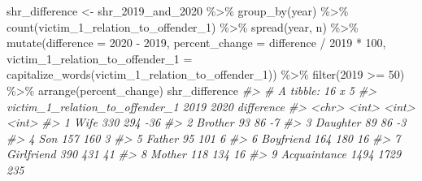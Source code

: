 \documentclass[
]{krantz}
\makeatletter
\newenvironment{Shaded}{\begin{snugshade}}{\end{snugshade}}
\newcommand{\AttributeTok}[1]{\textcolor[rgb]{0.61,0.61,0.61}{#1}}
\newcommand{\CommentTok}[1]{\textcolor[rgb]{0.37,0.37,0.37}{\textit{#1}}}
\newcommand{\DecValTok}[1]{\textcolor[rgb]{0.06,0.06,0.06}{#1}}
\newcommand{\FunctionTok}[1]{\textcolor[rgb]{0,0,0}{#1}}
\newcommand{\NormalTok}[1]{#1}
\newcommand{\OtherTok}[1]{\textcolor[rgb]{0.37,0.37,0.37}{#1}}
\newcommand{\SpecialCharTok}[1]{\textcolor[rgb]{0,0,0}{#1}}
\newcommand{\StringTok}[1]{\textcolor[rgb]{0.5,0.5,0.5}{#1}}
\newenvironment{kframe}{%
\medskip{}
\setlength{\fboxsep}{.8em}
 \def\at@end@of@kframe{}%
 \ifinner\ifhmode%
  \def\at@end@of@kframe{\end{minipage}}%
  \begin{minipage}{\columnwidth}%
 \fi\fi%
 \def\FrameCommand##1{\hskip\@totalleftmargin \hskip-\fboxsep
 \colorbox{shadecolor}{##1}\hskip-\fboxsep
     \hskip-\linewidth \hskip-\@totalleftmargin \hskip\columnwidth}%
 \MakeFramed {\advance\hsize-\width
   \@totalleftmargin\z@ \linewidth\hsize
   \@setminipage}}%
 {\par\unskip\endMakeFramed%
 \at@end@of@kframe}
\renewenvironment{Shaded}{\begin{kframe}}{\end{kframe}}
\makeatother
\begin{document}
\begin{Shaded}
\begin{Highlighting}[]
\NormalTok{shr\_difference }\OtherTok{\textless{}{-}} 
\NormalTok{  shr\_2019\_and\_2020 }\SpecialCharTok{\%\textgreater{}\%}
  \FunctionTok{group\_by}\NormalTok{(year) }\SpecialCharTok{\%\textgreater{}\%}
  \FunctionTok{count}\NormalTok{(victim\_1\_relation\_to\_offender\_1) }\SpecialCharTok{\%\textgreater{}\%}
  \FunctionTok{spread}\NormalTok{(year, n) }\SpecialCharTok{\%\textgreater{}\%}
  \FunctionTok{mutate}\NormalTok{(}\AttributeTok{difference =} \StringTok{\textasciigrave{}}\AttributeTok{2020}\StringTok{\textasciigrave{}} \SpecialCharTok{{-}} \StringTok{\textasciigrave{}}\AttributeTok{2019}\StringTok{\textasciigrave{}}\NormalTok{,}
         \AttributeTok{percent\_change =}\NormalTok{ difference }\SpecialCharTok{/} \StringTok{\textasciigrave{}}\AttributeTok{2019}\StringTok{\textasciigrave{}} \SpecialCharTok{*} \DecValTok{100}\NormalTok{,}
         \AttributeTok{victim\_1\_relation\_to\_offender\_1 =} \FunctionTok{capitalize\_words}\NormalTok{(victim\_1\_relation\_to\_offender\_1)) }\SpecialCharTok{\%\textgreater{}\%}
  \FunctionTok{filter}\NormalTok{(}\StringTok{\textasciigrave{}}\AttributeTok{2019}\StringTok{\textasciigrave{}} \SpecialCharTok{\textgreater{}=} \DecValTok{50}\NormalTok{) }\SpecialCharTok{\%\textgreater{}\%}
  \FunctionTok{arrange}\NormalTok{(percent\_change)}
\NormalTok{shr\_difference}
\CommentTok{\#\textgreater{} \# A tibble: 16 x 5}
\CommentTok{\#\textgreater{}    victim\_1\_relation\_to\_offender\_1 \textasciigrave{}2019\textasciigrave{} \textasciigrave{}2020\textasciigrave{} difference}
\CommentTok{\#\textgreater{}    \textless{}chr\textgreater{}                            \textless{}int\textgreater{}  \textless{}int\textgreater{}      \textless{}int\textgreater{}}
\CommentTok{\#\textgreater{}  1 Wife                               330    294        {-}36}
\CommentTok{\#\textgreater{}  2 Brother                             93     86         {-}7}
\CommentTok{\#\textgreater{}  3 Daughter                            89     86         {-}3}
\CommentTok{\#\textgreater{}  4 Son                                157    160          3}
\CommentTok{\#\textgreater{}  5 Father                              95    101          6}
\CommentTok{\#\textgreater{}  6 Boyfriend                          164    180         16}
\CommentTok{\#\textgreater{}  7 Girlfriend                         390    431         41}
\CommentTok{\#\textgreater{}  8 Mother                             118    134         16}
\CommentTok{\#\textgreater{}  9 Acquaintance                      1494   1729        235}

\end{Highlighting}
\end{Shaded}
\end{document}
